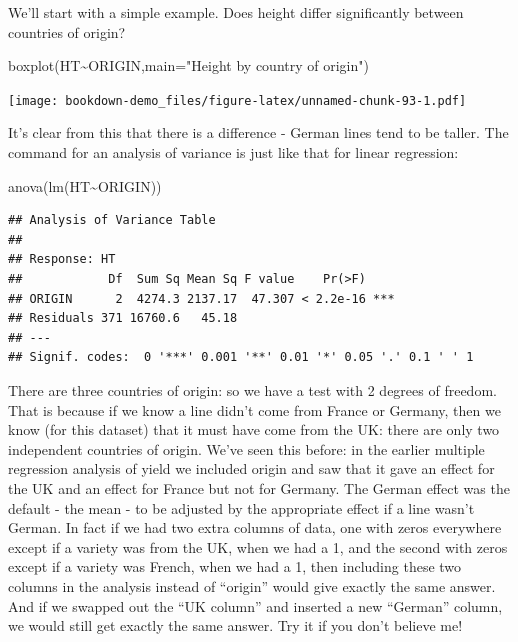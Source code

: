 \documentclass[
]{book}
\newenvironment{Shaded}{\begin{snugshade}}{\end{snugshade}}
\newcommand{\AttributeTok}[1]{\textcolor[rgb]{0.77,0.63,0.00}{#1}}
\newcommand{\FunctionTok}[1]{\textcolor[rgb]{0.00,0.00,0.00}{#1}}
\newcommand{\NormalTok}[1]{#1}
\newcommand{\SpecialCharTok}[1]{\textcolor[rgb]{0.00,0.00,0.00}{#1}}
\newcommand{\StringTok}[1]{\textcolor[rgb]{0.31,0.60,0.02}{#1}}
\begin{document}
We'll start with a simple example. Does height differ significantly between countries of origin?

\begin{Shaded}
\begin{Highlighting}[]
\FunctionTok{boxplot}\NormalTok{(HT}\SpecialCharTok{\textasciitilde{}}\NormalTok{ORIGIN,}\AttributeTok{main=}\StringTok{"Height by country of origin"}\NormalTok{)}
\end{Highlighting}
\end{Shaded}

\texttt{[image: bookdown-demo\_files/figure-latex/unnamed-chunk-93-1.pdf]}

It's clear from this that there is a difference - German lines tend to be taller. The command for an analysis of variance is just like that for linear regression:

\begin{Shaded}
\begin{Highlighting}[]
\FunctionTok{anova}\NormalTok{(}\FunctionTok{lm}\NormalTok{(HT}\SpecialCharTok{\textasciitilde{}}\NormalTok{ORIGIN))}
\end{Highlighting}
\end{Shaded}

\begin{verbatim}
## Analysis of Variance Table
## 
## Response: HT
##            Df  Sum Sq Mean Sq F value    Pr(>F)    
## ORIGIN      2  4274.3 2137.17  47.307 < 2.2e-16 ***
## Residuals 371 16760.6   45.18                      
## ---
## Signif. codes:  0 '***' 0.001 '**' 0.01 '*' 0.05 '.' 0.1 ' ' 1
\end{verbatim}

There are three countries of origin: so we have a test with 2 degrees of freedom. That is because if we know a line didn't come from France or Germany, then we know (for this dataset) that it must have come from the UK: there are only two independent countries of origin. We've seen this before: in the earlier multiple regression analysis of yield we included origin and saw that it gave an effect for the UK and an effect for France but not for Germany. The German effect was the default - the mean - to be adjusted by the appropriate effect if a line wasn't German. In fact if we had two extra columns of data, one with zeros everywhere except if a variety was from the UK, when we had a 1, and the second with zeros except if a variety was French, when we had a 1, then including these two columns in the analysis instead of ``origin'' would give exactly the same answer. And if we swapped out the ``UK column'' and inserted a new ``German'' column, we would still get exactly the same answer. Try it if you don't believe me!
\end{document}
